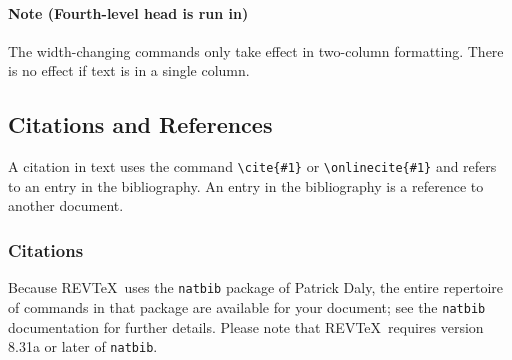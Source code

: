 \documentclass[%
reprint,
amsmath,amssymb,
aps,
]{revtex4-2}
\begin{document}
	\paragraph{Note (Fourth-level head is run in)}
	The width-changing commands only take effect in two-column formatting. 
	There is no effect if text is in a single column.
	
	\subsection{\label{sec:citeref}Citations and References}
	A citation in text uses the command \verb+\cite{#1}+ or
	\verb+\onlinecite{#1}+ and refers to an entry in the bibliography. 
	An entry in the bibliography is a reference to another document.
	
	\subsubsection{Citations}
	Because REV\TeX\ uses the \verb+natbib+ package of Patrick Daly, 
	the entire repertoire of commands in that package are available for your document;
	see the \verb+natbib+ documentation for further details. Please note that
	REV\TeX\ requires version 8.31a or later of \verb+natbib+.
	
\end{document}
